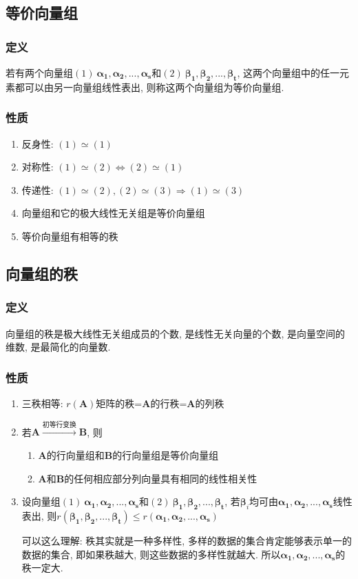 \subsection{等价向量组}
\subsubsection{定义}
若有两个向量组$ (1)\ \bm{\alpha_{1}},\bm{\alpha_{2}},...,\bm{\alpha_{s}} $和$ (2)\ \bm{\beta_{1}},\bm{\beta_{2}},...,\bm{\beta_{t}} $, 这两个向量组中的任一元素都可以由另一向量组线性表出, 则称这两个向量组为等价向量组.
\subsubsection{性质}
\begin{enumerate}
\item 反身性: $ (1)\simeq (1) $
\item 对称性: $ (1)\simeq (2) \Leftrightarrow (2)\simeq (1) $
\item 传递性: $ (1)\simeq (2), (2)\simeq (3) \Rightarrow (1)\simeq (3) $
\item 向量组和它的极大线性无关组是等价向量组
\item 等价向量组有相等的秩
\end{enumerate}
\subsection{向量组的秩}
\subsubsection{定义}
向量组的秩是极大线性无关组成员的个数, 是线性无关向量的个数, 是向量空间的维数, 是最简化的向量数.
\subsubsection{性质}
\begin{enumerate}
\item 三秩相等: $ r(\bm{A}) $矩阵的秩=$ \bm{A} $的行秩=$ \bm{A} $的列秩
\item 若$ \bm{A}\xrightarrow{\text{初等行变换}}\bm{B}$, 则
\begin{enumerate}
\item $ \bm{A} $的行向量组和$ \bm{B} $的行向量组是等价向量组
\item $ \bm{A} $和$ \bm{B} $的任何相应部分列向量具有相同的线性相关性
\end{enumerate}
\item 设向量组$ (1)\ \bm{\alpha_{1}},\bm{\alpha_{2}},...,\bm{\alpha_{s}} $和$ (2)\ \bm{\beta_{1}},\bm{\beta_{2}},...,\bm{\beta_{t}} $, 若$ \bm{\beta}_{i} $均可由$ \bm{\alpha_{1}},\bm{\alpha_{2}},...,\bm{\alpha_{s}} $线性表出, 则$ r(\bm{\beta_{1}},\bm{\beta_{2}},...,\bm{\beta_{t}})\le r(\bm{\alpha_{1}},\bm{\alpha_{2}},...,\bm{\alpha_{s}}) $ \par
可以这么理解: 秩其实就是一种多样性, 多样的数据的集合肯定能够表示单一的数据的集合, 即如果秩越大, 则这些数据的多样性就越大. 所以$\bm{\alpha_{1}},\bm{\alpha_{2}},...,\bm{\alpha_{s}}$的秩一定大.
\end{enumerate}
